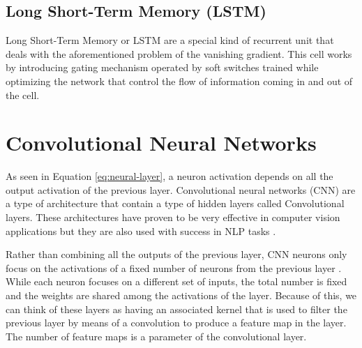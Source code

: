 \subsection{Long Short-Term Memory (LSTM)}

Long Short-Term Memory \cite{hochreiter1997long} or LSTM are a special kind of recurrent unit that deals with the aforementioned problem of the vanishing gradient. This cell works by introducing gating mechanism operated by soft switches trained while optimizing the network that control the flow of information coming in and out of the cell.

\section{Convolutional Neural Networks}

As seen in Equation \ref{eq:neural-layer}, a neuron activation depends on all the output activation of the previous layer. Convolutional neural networks (CNN) are a type of architecture that contain a type of hidden layers called Convolutional layers. These architectures have proven to be very effective in computer vision applications but they are also used with success in NLP tasks \cite{zhang2015character}.

Rather than combining all the outputs of the previous layer, CNN neurons only focus on the activations of a fixed number of neurons from the previous layer \cite{krizhevsky2012imagenet}. While each neuron focuses on a different set of inputs, the total number is fixed and the weights are shared among the activations of the layer. Because of this, we can think of these layers as having an associated kernel that is used to filter the previous layer by means of a convolution to produce a feature map in the layer. The number of feature maps is a parameter of the convolutional layer. %

